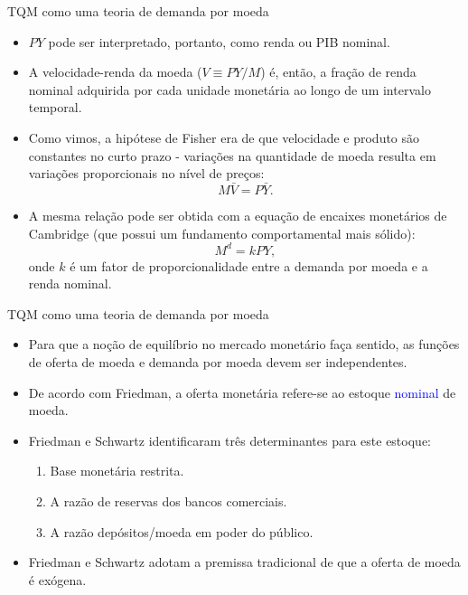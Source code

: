\documentclass[10pt]{beamer}
\begin{document}
\begin{frame}{TQM como uma teoria de demanda por moeda}
    \begin{itemize}
        \item $PY$ pode ser interpretado, portanto, como renda ou PIB nominal.
        \bigskip
        \item A velocidade-renda da moeda ($V \equiv PY/M$) é, então, a fração de renda nominal adquirida por cada unidade monetária ao longo de um intervalo temporal.
        \bigskip
        \item Como vimos, a hipótese de Fisher era de que velocidade e produto são constantes no curto prazo - variações na quantidade de moeda resulta em variações proporcionais no nível de preços:
        \[
        M\bar{V} = P\bar{Y}.
        \]
        \bigskip
        \item A mesma relação pode ser obtida com a equação de encaixes monetários de Cambridge (que possui um fundamento comportamental mais sólido):
        \[
        M^d = kPY,
        \]
        onde $k$ é um fator de proporcionalidade entre a demanda por moeda e a renda nominal.
    \end{itemize}
\end{frame}

\begin{frame}{TQM como uma teoria de demanda por moeda}
    \begin{itemize}
        \item Para que a noção de equilíbrio no mercado monetário faça sentido, as funções de oferta de moeda e demanda por moeda devem ser independentes.
        \bigskip
        \item De acordo com Friedman, a oferta monetária refere-se ao estoque \textcolor{blue}{nominal} de moeda.
        \bigskip
        \item Friedman e Schwartz identificaram três determinantes para este estoque:
        \bigskip
        \begin{enumerate}
            \item Base monetária restrita.
            \bigskip
            \item A razão de reservas dos bancos comerciais.
            \bigskip
            \item A razão depósitos/moeda em poder do público.
        \end{enumerate}
        \bigskip
        \item Friedman e Schwartz adotam a premissa tradicional de que a oferta de moeda é exógena.
    \end{itemize}
\end{frame}
\end{document}
